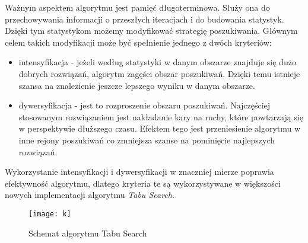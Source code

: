 Ważnym aspektem algorytmu jest pamięć długoterminowa. Służy ona do przechowywania informacji o przeszłych iteracjach i do budowania statystyk. Dzięki tym statystykom możemy modyfikować strategię poszukiwania. Głównym celem takich modyfikacji może być spełnienie jednego z dwóch kryteriów:
\begin{itemize}
	\item intensyfikacja - jeżeli według statystyki w danym obszarze znajduje się dużo dobrych rozwiązań, algorytm zagęści obszar poszukiwań. Dzięki temu istnieje szansa na znalezienie jeszcze lepszego wyniku w danym obszarze.
	\item dywersyfikacja - jest to rozproszenie obszaru poszukiwań. Najczęściej stosowanym rozwiązaniem jest nakładanie kary na ruchy, które powtarzają się w perspektywie dłuższego czasu. Efektem tego jest przeniesienie algorytmu w inne rejony poszukiwań co zmniejsza szanse na pominięcie najlepszych rozwiązań.
\end{itemize}
Wykorzystanie intensyfikacji i dywersyfikacji w znaczniej mierze poprawia efektywność algorytmu, dlatego kryteria te są wykorzystywane w większości nowych implementacji algorytmu \textit{Tabu Search}.


\begin{figure}
\centering
\texttt{[image: k]}
\caption{Schemat algorytmu Tabu Search}
\label{fig: AlgorytmTabu}
\end{figure}
